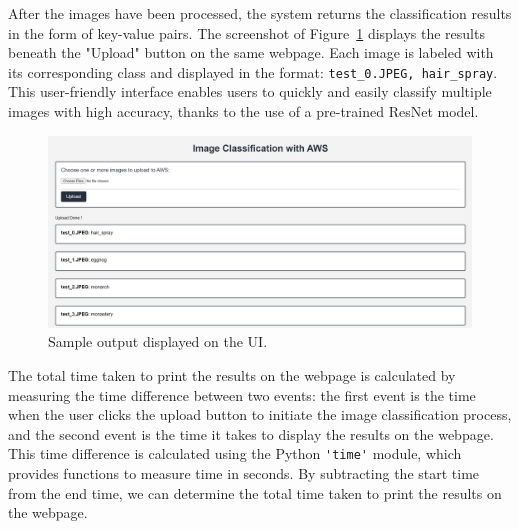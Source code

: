 \documentclass[../main.tex]{subfiles}
\begin{document}
After the images have been processed, the system returns the classification results in the form of key-value pairs. The screenshot of Figure~\ref{fig:op} displays the results beneath the "Upload" button on the same webpage. Each image is labeled with its corresponding class and displayed in the format: \verb|test_0.JPEG, hair_spray|. This user-friendly interface enables users to quickly and easily classify multiple images with high accuracy, thanks to the use of a pre-trained ResNet model.
\begin{figure}[h!]
\centering
\includegraphics[scale=0.36]{images/output.png}
\caption{Sample output displayed on the UI.}
\label{fig:op}
\end{figure}

The total time taken to print the results on the webpage is calculated by measuring the time difference between two events: the first event is the time when the user clicks the upload button to initiate the image classification process, and the second event is the time it takes to display the results on the webpage. This time difference is calculated using the Python \verb|'time'| module, which provides functions to measure time in seconds. By subtracting the start time from the end time, we can determine the total time taken to print the results on the webpage. 
\end{document}
